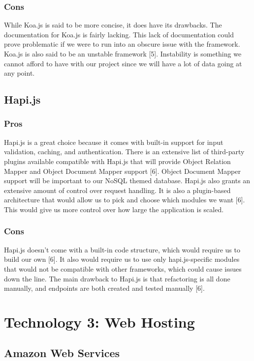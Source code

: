 \documentclass[onecolumn, draftclsnofoot,10pt, compsoc]{IEEEtran}
\begin{document}
    \subsubsection{Cons}
    While Koa.js is said to be more concise, it does have its drawbacks. The documentation for Koa.js is fairly lacking. This lack of documentation could prove problematic if we were to run into an obscure issue with the framework. Koa.js is also said to be an unstable framework [5]. Instability is something we cannot afford to have with our project since we will have a lot of data going at any point.
	
	\subsection{Hapi.js}
	
		\subsubsection{Pros}
		Hapi.js is a great choice because it comes with built-in support for input validation, caching, and authentication. There is an extensive list of third-party plugins available compatible with Hapi.js that will provide Object Relation Mapper and Object Document Mapper support [6]. Object Document Mapper support will be important to our NoSQL themed database. Hapi.js also grants an extensive amount of control over request handling. It is also a plugin-based architecture that would allow us to pick and choose which modules we want [6]. This would give us more control over how large the application is scaled.
    \subsubsection{Cons}
    Hapi.js doesn’t come with a built-in code structure, which would require us to build our own [6]. It also would require us to use only hapi.js-specific modules that would not be compatible with other frameworks, which could cause issues down the line. The main drawback to Hapi.js is that refactoring is all done manually, and endpoints are both created and tested manually [6].
	
	
\section{Technology 3: Web Hosting}

	\subsection{Amazon Web Services}
	
\end{document}
